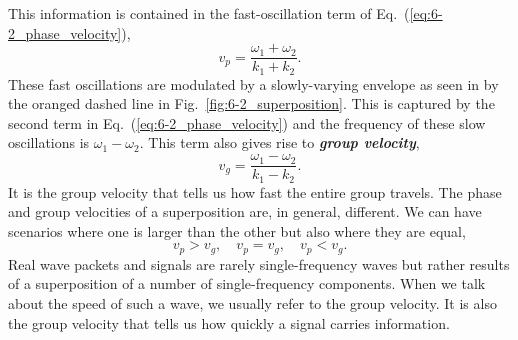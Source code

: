 This information is contained in the fast-oscillation term of Eq.~(\ref{eq:6-2_phase_velocity}),
\begin{equation}
    v_p = \frac{\omega_1 + \omega_2}{k_1 + k_2}.
\end{equation}
These fast oscillations are modulated by a slowly-varying envelope as seen in by the oranged dashed line in Fig.~\ref{fig:6-2_superposition}.
This is captured by the second term in Eq.~(\ref{eq:6-2_phase_velocity}) and the frequency of these slow oscillations is $\omega_1-\omega_2$.
This term also gives rise to \textit{\textbf{group velocity}},
\begin{equation}
    v_g = \frac{\omega_1 - \omega_2}{k_1 - k_2}.
\end{equation}
It is the group velocity that tells us how fast the entire group travels.
The phase and group velocities of a superposition are, in general, different.
We can have scenarios where one is larger than the other but also where they are equal,
\begin{equation}
    v_p > v_g, \quad v_p = v_g, \quad v_p < v_g.
\end{equation}
Real wave packets and signals are rarely single-frequency waves but rather results of a superposition of a number of single-frequency components.
When we talk about the speed of such a wave, we usually refer to the group velocity.
It is also the group velocity that tells us how quickly a signal carries information.


